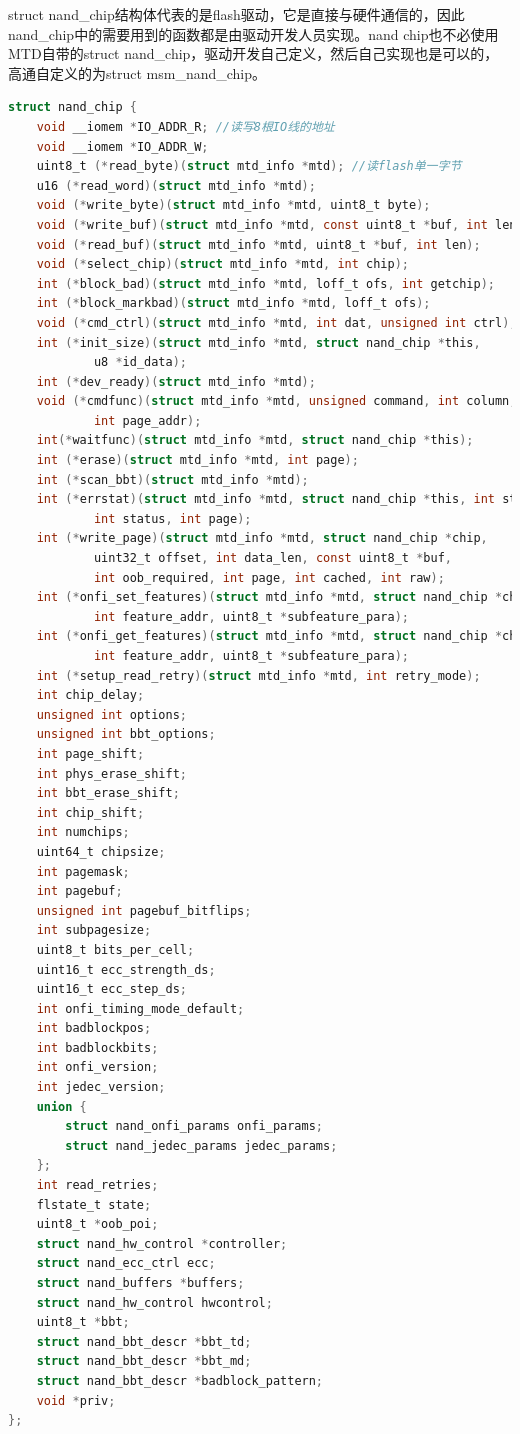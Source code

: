 \clearpage
struct nand\_chip结构体代表的是flash驱动，它是直接与硬件通信的，因此nand\_chip中的需要用到的函数都是由驱动开发人员实现。nand chip也不必使用MTD自带的struct nand\_chip，驱动开发自己定义，然后自己实现也是可以的，高通自定义的为struct msm\_nand\_chip。
\begin{lstlisting}[language=C]
struct nand_chip {
	void __iomem *IO_ADDR_R; //读写8根IO线的地址
	void __iomem *IO_ADDR_W;
	uint8_t (*read_byte)(struct mtd_info *mtd); //读flash单一字节
	u16 (*read_word)(struct mtd_info *mtd);
	void (*write_byte)(struct mtd_info *mtd, uint8_t byte);
	void (*write_buf)(struct mtd_info *mtd, const uint8_t *buf, int len);
	void (*read_buf)(struct mtd_info *mtd, uint8_t *buf, int len);
	void (*select_chip)(struct mtd_info *mtd, int chip);
	int (*block_bad)(struct mtd_info *mtd, loff_t ofs, int getchip);
	int (*block_markbad)(struct mtd_info *mtd, loff_t ofs);
	void (*cmd_ctrl)(struct mtd_info *mtd, int dat, unsigned int ctrl);
	int (*init_size)(struct mtd_info *mtd, struct nand_chip *this,
			u8 *id_data);
	int (*dev_ready)(struct mtd_info *mtd);
	void (*cmdfunc)(struct mtd_info *mtd, unsigned command, int column,
			int page_addr);
	int(*waitfunc)(struct mtd_info *mtd, struct nand_chip *this);
	int (*erase)(struct mtd_info *mtd, int page);
	int (*scan_bbt)(struct mtd_info *mtd);
	int (*errstat)(struct mtd_info *mtd, struct nand_chip *this, int state,
			int status, int page);
	int (*write_page)(struct mtd_info *mtd, struct nand_chip *chip,
			uint32_t offset, int data_len, const uint8_t *buf,
			int oob_required, int page, int cached, int raw);
	int (*onfi_set_features)(struct mtd_info *mtd, struct nand_chip *chip,
			int feature_addr, uint8_t *subfeature_para);
	int (*onfi_get_features)(struct mtd_info *mtd, struct nand_chip *chip,
			int feature_addr, uint8_t *subfeature_para);
	int (*setup_read_retry)(struct mtd_info *mtd, int retry_mode);
	int chip_delay;
	unsigned int options;
	unsigned int bbt_options;
	int page_shift;
	int phys_erase_shift;
	int bbt_erase_shift;
	int chip_shift;
	int numchips;
	uint64_t chipsize;
	int pagemask;
	int pagebuf;
	unsigned int pagebuf_bitflips;
	int subpagesize;
	uint8_t bits_per_cell;
	uint16_t ecc_strength_ds;
	uint16_t ecc_step_ds;
	int onfi_timing_mode_default;
	int badblockpos;
	int badblockbits;
	int onfi_version;
	int jedec_version;
	union {
		struct nand_onfi_params	onfi_params;
		struct nand_jedec_params jedec_params;
	};
	int read_retries;
	flstate_t state;
	uint8_t *oob_poi;
	struct nand_hw_control *controller;
	struct nand_ecc_ctrl ecc;
	struct nand_buffers *buffers;
	struct nand_hw_control hwcontrol;
	uint8_t *bbt;
	struct nand_bbt_descr *bbt_td;
	struct nand_bbt_descr *bbt_md;
	struct nand_bbt_descr *badblock_pattern;
	void *priv;
};

\end{lstlisting}
























